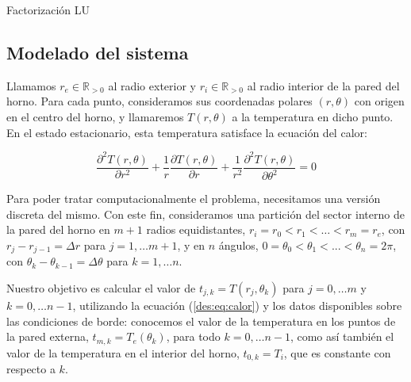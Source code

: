       \begin{algorithm}[H]
        \caption{Factorización LU}
      \end{algorithm}

  \subsection{Modelado del sistema}

     Llamamos $r_e \in \mathbb{R}_{>0}$ al radio exterior y $r_i \in \mathbb{R}_{>0}$ al radio interior de la pared del horno. Para cada punto, consideramos sus coordenadas polares $(r, \theta)$ con origen en el centro del horno, y llamaremos $T(r, \theta)$ a la temperatura en dicho punto. En el estado estacionario, esta temperatura satisface la ecuación del calor:

      \begin{equation} \label{des:eq:calor}
        \frac{\partial^2 T(r, \theta)}{\partial r^2} + \frac{1}{r} \frac{\partial T(r, \theta)}{\partial r} + \frac{1}{r^2} \frac{\partial^2 T(r, \theta)}{\partial \theta^2} = 0
      \end{equation}

      Para poder tratar computacionalmente el problema, necesitamos una versión discreta del mismo. Con este fin, consideramos una partición del sector interno de la pared del horno en $m + 1$ radios equidistantes, $r_i = r_0 < r_1 < \dots < r_m = r_e$, con $r_j - r_{j-1} = \Delta r$ para $j = 1, \dots m+1$, y en $n$ ángulos, $0 = \theta_0 < \theta_1 < ... < \theta_n = 2\pi$, con $\theta_k - \theta_{k-1} = \Delta \theta$ para $k = 1, \dots n$.

      Nuestro objetivo es calcular el valor de $t_{j,k} = T(r_j, \theta_k)$ para $j = 0, \dots m$ y $k = 0, \dots n-1$, utilizando la ecuación (\ref{des:eq:calor}) y los datos disponibles sobre las condiciones de borde: conocemos el valor de la temperatura en los puntos de la pared externa, $t_{m,k} = T_e(\theta_k)$, para todo $k = 0, \dots n-1$, como así también el valor de la temperatura en el interior del horno, $t_{0,k} = T_i$, que es constante con respecto a $k$.

